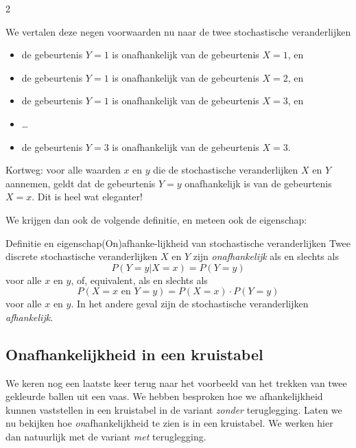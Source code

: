 \begin{multicols} {2}
\newpage

We vertalen deze negen voorwaarden nu naar de twee stochastische veranderlijken
\begin{itemize}
    \item de gebeurtenis $Y=1$ is onafhankelijk van de gebeurtenis $X=1$, en
    \item de gebeurtenis $Y=1$ is onafhankelijk van de gebeurtenis $X=2$, en
    \item de gebeurtenis $Y=1$ is onafhankelijk van de gebeurtenis $X=3$, en
    \item \dots
    \item de gebeurtenis $Y=3$ is onafhankelijk van de gebeurtenis $X=3$.
\end{itemize}
Kortweg: voor alle waarden $x$ en $y$ die de stochastische veranderlijken $X$ en $Y$ aannemen, geldt dat de gebeurtenis $Y=y$ onafhankelijk is van de gebeurtenis $X=x$. Dit is heel wat eleganter!

We krijgen dan ook de volgende definitie, en meteen ook de eigenschap:

\begin{kader}{Definitie en eigenschap}{(On)afhanke-lijkheid van stochastische veranderlijken}
Twee discrete stochastische veranderlijken $X$ en $Y$ zijn \emph{onafhankelijk} als en slechts als
$$P(Y=y|X=x)=P(Y=y)$$ 
voor alle $x$ en $y$, of, equivalent, als en slechts als
$$P(X=x \text{ en } Y=y )=P(X=x) \cdot P(Y=y)$$
voor alle $x$ en $y$. In het andere geval zijn de stochastische veranderlijken \emph{afhankelijk}.
\end{kader}

\subsection*{Onafhankelijkheid in een kruistabel}
We keren nog een laatste keer terug naar het voorbeeld van het trekken van twee gekleurde ballen uit een vaas. We hebben besproken hoe we afhankelijkheid kunnen vaststellen in een kruistabel in de variant \emph{zonder} teruglegging. Laten we nu bekijken hoe \emph{on}afhankelijkheid te zien is in een kruistabel. We werken hier dan natuurlijk met de variant \emph{met} teruglegging.

\end{multicols}

